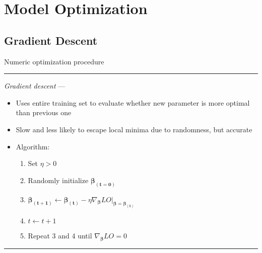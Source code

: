 \section{Model Optimization}
\subsection*{Gradient Descent}
Numeric optimization procedure

{\color{lightgray}\hrule height 0.001mm}

\emph{Gradient descent} ---
\begin{itemize}
    \item Uses entire training set to evaluate whether new parameter is more optimal than previous one
    \item Slow and less likely to escape local minima due to randomness, but accurate
    \item Algorithm: 
    \begin{enumerate}
        \item Set $\eta > 0$
        \item Randomly initialize $\boldsymbol{\beta_{(t=0)}}$
        \item $\boldsymbol{\beta_{(t+1)}} \leftarrow \boldsymbol{\beta_{(t)}} - \eta \nabla_{\boldsymbol{\beta}} LO |_{\boldsymbol{\beta} = \boldsymbol{\beta_{(t)}}}$
        \item $t \leftarrow t+1$
        \item Repeat 3 and 4 until $\nabla_{\boldsymbol{\beta}} LO = 0$
    \end{enumerate}
\end{itemize}

{\color{lightgray}\hrule height 0.001mm}

